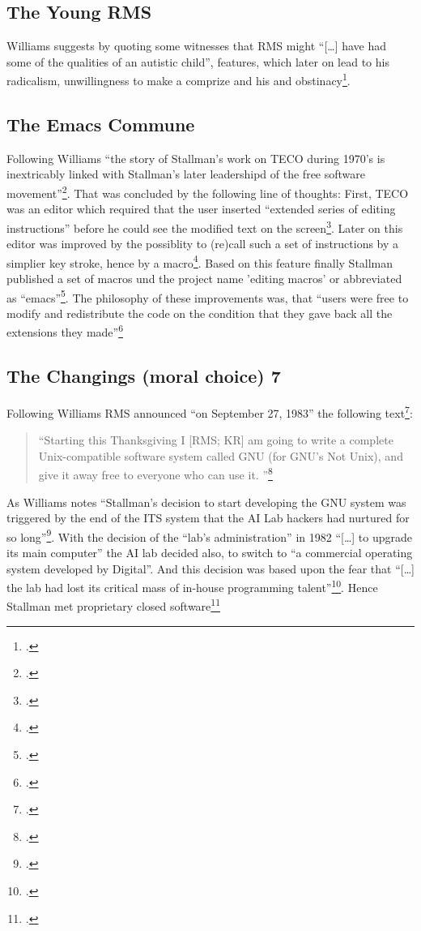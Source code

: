 \documentclass[DIV=calc,BCOR=5mm,11pt,headings=small,oneside,abstract=true, toc=bib]{scrartcl}
\begin{document}
\subsection{The Young RMS}

Williams suggests by quoting some witnesses that RMS might \enquote{[\ldots]
have had some of the qualities of an autistic child}, features, which
later on lead to his radicalism, unwillingness to make a comprize and his and
obstinacy\footcite[cf][31 et passim]{Williams2002a}.

\subsection{The Emacs Commune}

Following Williams \enquote{the story of Stallman's work on TECO during 1970's is
inextricably linked with Stallman's later leadershipd of the free software
movement}\footcite[cf][80]{Williams2002a}. That was concluded by the
following line of thoughts: First, TECO was an editor which required that the
user inserted \enquote{extended series of editing instructions} before he
could see the modified text on the screen\footcite[cf][81]{Williams2002a}. Later
on this editor was improved by the possiblity to (re)call such a set of
instructions by a simplier key stroke, hence by a
macro\footcite[cf][82]{Williams2002a}. Based on this feature finally Stallman
published a set of macros und the project name 'editing macros' or abbreviated
as \enquote{emacs}\footcite[cf][84f]{Williams2002a}. The philosophy of these
improvements was, that \enquote{users were free to modify and redistribute the
code on the condition that they gave back all the extensions they
made}\footcite[cf][85]{Williams2002a}

\subsection{The Changings (moral choice) 7}

Following Williams RMS announced \enquote{on September 27, 1983} the
following text\footcite[cf][85]{Williams2002a}:

\begin{quote}
\enquote{Starting this Thanksgiving I [RMS; KR] am going to write a complete
Unix-compatible software system called GNU (for GNU's Not Unix), and give it away free to
everyone who can use it.
}\footcite[][85]{Williams2002a}
\end{quote}

As Williams notes \enquote{Stallman's decision to start developing the GNU
system was triggered by the end of the ITS system that the AI Lab hackers
had nurtured for so long}\footcite[][91]{Williams2002a}. With the decision
of the \enquote{lab's administration} in 1982 \enquote{[\ldots] to
upgrade its main computer} the AI lab decided also, to switch to
\enquote{a commercial operating system developed by Digital}. And this
decision was based upon the fear that \enquote{[\ldots] the lab had lost
its critical mass of in-house programming
talent}\footcite[cf][92]{Williams2002a}. Hence Stallman met proprietary
closed software\footcite[cf][92]{Williams2002a}
\end{document}
